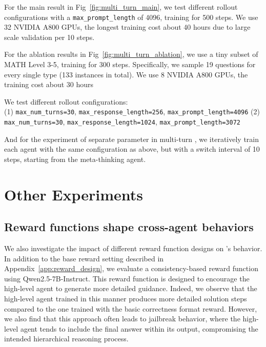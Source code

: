For the main result in Fig~\ref{fig:multi_turn_main}, we test different rollout configurations with a \texttt{max\_prompt\_length} of 4096, training for 500 steps. We use 32 NVIDIA A800 GPUs, the longest training cost about 40 hours due to large scale validation per 10 steps.

For the ablation results in Fig~\ref{fig:multi_turn_ablation}, we use a tiny subset of MATH Level 3-5, training for 300 steps. Specifically, we sample 19 questions for every single type (133 instances in total). We use 8 NVIDIA A800 GPUs, the training cost about 30 hours

We test different rollout configurations:\\
(1) \texttt{max\_num\_turns=30}, \texttt{max\_response\_length=256}, \texttt{max\_prompt\_length=4096}
(2) \texttt{max\_num\_turns=30}, \texttt{max\_response\_length=1024}, \texttt{max\_prompt\_length=3072}

And for the experiment of separate parameter in multi-turn \method, we iteratively train each agent with the same configuration as above, but with a switch interval of 10 steps, starting from the meta-thinking agent.


\section{Other Experiments}
\label{app:other_exp}
\subsection{Reward functions shape cross-agent behaviors}
\label{exp:reward_design}
We also investigate the impact of different reward function designs on \method's behavior.  
In addition to the base reward setting described in Appendix~\ref{app:reward_design}, we evaluate a consistency-based reward function using Qwen2.5-7B-Instruct.  
This reward function is designed to encourage the high-level agent to generate more detailed guidance.  
Indeed, we observe that the high-level agent trained in this manner produces more detailed solution steps compared to the one trained with the basic correctness format reward.  
However, we also find that this approach often leads to jailbreak behavior, where the high-level agent tends to include the final answer within its output, compromising the intended hierarchical reasoning process.  

